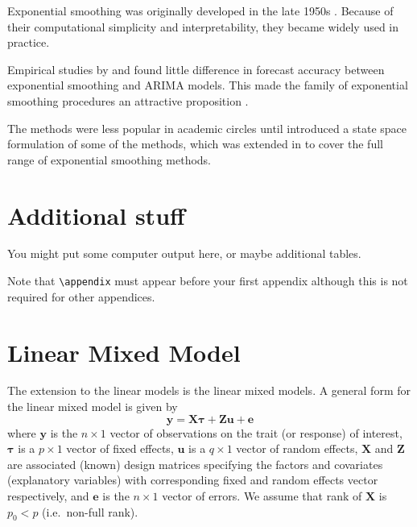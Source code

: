 \documentclass{sydneythesis}
\begin{document}
Exponential smoothing was originally developed in the late 1950s \autocite{Brown59,Brown63,Holt57,Winters60}. Because of their computational simplicity and interpretability, they became widely used in practice.

Empirical studies by \textcite{MH79} and \textcite{Metal82} found little difference in forecast accuracy between exponential smoothing and ARIMA models. This made the family of exponential smoothing procedures an attractive proposition \autocite[see][]{CKOS01}.

The methods were less popular in academic circles until \textcite{OKS97} introduced a state space formulation of some of the methods, which was extended in \textcite{HKSG02} to cover the full range of exponential smoothing methods.

\appendix

\hypertarget{additional-stuff}{%
\chapter{Additional stuff}\label{additional-stuff}}

You might put some computer output here, or maybe additional tables.

Note that \texttt{\textbackslash{}appendix} must appear before your first appendix although this is not required for other appendices.

\chapter{Linear Mixed Model}\label{lmm}

The extension to the linear models is the linear mixed models. A general form for the linear mixed model is given by
\begin{equation}
\boldsymbol{y} = \boldsymbol{X}\boldsymbol{\tau} + \boldsymbol{Z}\boldsymbol{u} + \boldsymbol{e} \label{eq:lmm}
\end{equation}
where \(\boldsymbol{y}\) is the \(n\times 1\) vector of observations on the trait (or response) of interest, \(\boldsymbol{\tau}\) is a \(p \times 1\) vector of fixed effects, \(\boldsymbol{u}\) is a \(q \times 1\) vector of random effects, \(\boldsymbol{X}\) and \(\boldsymbol{Z}\) are associated (known) design matrices specifying the factors and covariates (explanatory variables) with corresponding fixed and random effects vector respectively, and \(\boldsymbol{e}\) is the \(n\times 1\) vector of errors. We assume that rank of \(\boldsymbol{X}\) is \(p_0 < p\) (i.e.~non-full rank).
\end{document}
